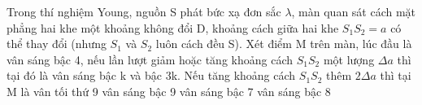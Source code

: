 \begin{ex}%
Trong thí nghiệm Young, nguồn S phát bức xạ đơn sắc $\lambda$, màn quan sát cách mặt phẳng hai khe một khoảng không đổi D, khoảng cách giữa hai khe $S_1S_2=a$ có thể thay đổi (nhưng $S_1$ và $S_2$ luôn cách đều S). Xét điểm M trên màn, lúc đầu là vân sáng bậc 4, nếu lần lượt giảm hoặc tăng khoảng cách $S_1S_2$ một lượng $\Delta a$ thì tại đó là vân sáng bậc k và bậc 3k. Nếu tăng khoảng cách $S_1S_2$ thêm $2\Delta a$ thì tại M là
\choice
{vân tối thứ 9}
{vân sáng bậc 9}
{vân sáng bậc 7}
{\True vân sáng bậc 8}
\end{ex} 

